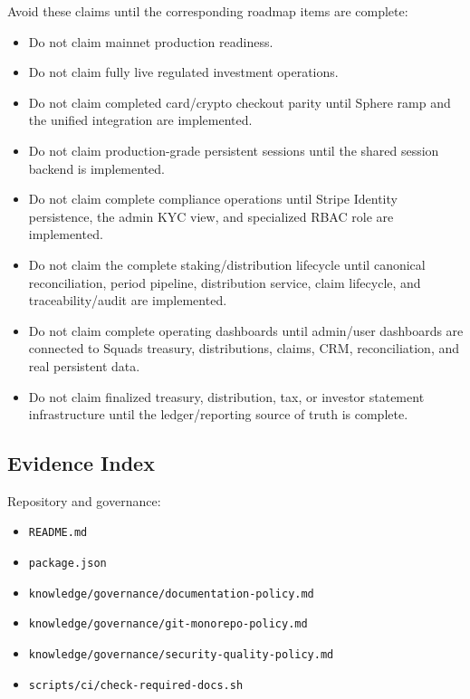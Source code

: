 \documentclass[
  10pt,
  letterpaper,
]{article}
\providecommand{\tightlist}{%
  \setlength{\itemsep}{0pt}\setlength{\parskip}{0pt}}
\let\oldtexttt\texttt
\renewcommand{\texttt}[1]{\oldtexttt{\small #1}}
\begin{document}
Avoid these claims until the corresponding roadmap items are complete:

\begin{itemize}
\tightlist
\item
  Do not claim mainnet production readiness.
\item
  Do not claim fully live regulated investment operations.
\item
  Do not claim completed card/crypto checkout parity until Sphere ramp
  and the unified integration are implemented.
\item
  Do not claim production-grade persistent sessions until the shared
  session backend is implemented.
\item
  Do not claim complete compliance operations until Stripe Identity
  persistence, the admin KYC view, and specialized RBAC role are
  implemented.
\item
  Do not claim the complete staking/distribution lifecycle until
  canonical reconciliation, period pipeline, distribution service, claim
  lifecycle, and traceability/audit are implemented.
\item
  Do not claim complete operating dashboards until admin/user dashboards
  are connected to Squads treasury, distributions, claims, CRM,
  reconciliation, and real persistent data.
\item
  Do not claim finalized treasury, distribution, tax, or investor
  statement infrastructure until the ledger/reporting source of truth is
  complete.
\end{itemize}

\subsection{Evidence Index}\label{evidence-index}

Repository and governance:

\begin{itemize}
\tightlist
\item
  \texttt{README.md}
\item
  \texttt{package.json}
\item
  \texttt{knowledge/governance/documentation-policy.md}
\item
  \texttt{knowledge/governance/git-monorepo-policy.md}
\item
  \texttt{knowledge/governance/security-quality-policy.md}
\item
  \texttt{scripts/ci/check-required-docs.sh}
\end{itemize}
\end{document}
